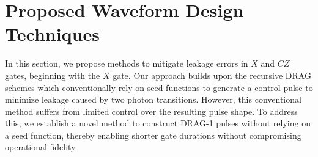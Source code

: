 \section{Proposed Waveform Design Techniques}
\label{sec:methods}
In this section, we propose methods to mitigate leakage errors in $X$ and $CZ$ gates, beginning with the $X$ gate. Our
approach builds upon the recursive DRAG schemes which conventionally rely on seed functions to generate a control pulse to
minimize leakage caused by two photon transitions. However, this conventional method suffers from limited control over
the resulting pulse shape. To address this, we establish a novel method to construct DRAG-1 pulses without relying on
a seed function, thereby enabling shorter gate durations without compromising operational fidelity.

